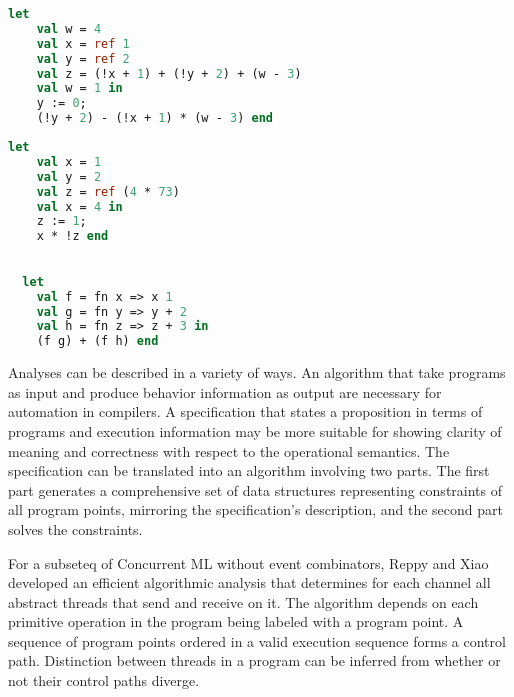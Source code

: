 \documentclass{article}
\begin{document}
\begin{lstlisting}[language=ML, escapechar=\%]
  let
    val w = 4
    val x = ref 1
    val y = ref 2
    val z = (!x + 1) + (!y + 2) + (w - 3)
    val w = 1 in
    y := 0;
    (!y + 2) - (!x + 1) * (w - 3) end
  \end{lstlisting}

\begin{lstlisting}[language=ML, escapechar=\%]
  let 
    val x = 1  
    val y = 2
    val z = ref (4 * 73)
    val x = 4 in 
    z := 1; 
    x * !z end
  \end{lstlisting}

\begin{lstlisting}[language=ML, escapechar=\%]

  let 
    val f = fn x => x 1
    val g = fn y => y + 2
    val h = fn z => z + 3 in 
    (f g) + (f h) end

\end{lstlisting}




Analyses can be described in a variety of ways.  An algorithm that take programs as input and
produce behavior information as output are necessary for automation in compilers.  A
specification that states a proposition in terms of programs and execution information may be
more suitable for showing clarity of meaning and correctness with respect to the operational
semantics.  The specification can be translated into an algorithm involving two parts.  The
first part generates a comprehensive set of data structures representing constraints of all
program points, mirroring the specification's description, and the second part solves the
constraints.

For a subseteq of Concurrent ML without event combinators, Reppy and  Xiao developed an
efficient algorithmic analysis that determines for each channel all abstract threads that send
and receive on it.  The algorithm depends on each primitive operation in the program being
labeled with a program point.  A sequence of program points ordered in a valid execution
sequence forms a control path.  Distinction between threads in a program can be inferred from
whether or not their control paths diverge.  
\end{document}
